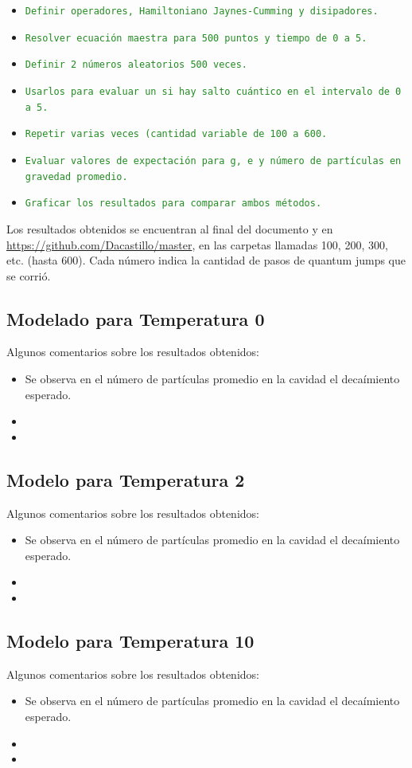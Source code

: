 \documentclass{book}
\begin{document}
\begin{itemize}
\item\textcolor{ForestGreen}{\texttt{Definir operadores, Hamiltoniano Jaynes-Cumming y disipadores.}}
\item\textcolor{ForestGreen}{\texttt{Resolver ecuación maestra para 500 puntos y tiempo de 0 a 5.}}
\item\textcolor{ForestGreen}{\texttt{Definir 2 números aleatorios 500 veces.}}
\item\textcolor{ForestGreen}{\texttt{Usarlos para evaluar un si hay salto cuántico en el intervalo de 0 a 5.}}
\item\textcolor{ForestGreen}{\texttt{Repetir varias veces (cantidad variable de 100 a 600.}}
\item\textcolor{ForestGreen}{\texttt{Evaluar valores de expectación para g, e y número de partículas en gravedad promedio.}}
\item\textcolor{ForestGreen}{\texttt{Graficar los resultados para comparar ambos métodos.}}
\end{itemize}
Los resultados obtenidos se encuentran al final del documento y en \textcolor{ForestGreen}{\url{https://github.com/Dacastillo/master}}, en las carpetas llamadas 100, 200, 300, etc. (hasta 600). Cada número indica la cantidad de pasos de quantum jumps que se corrió.
\subsection{{Modelado para Temperatura 0}}
Algunos comentarios sobre los resultados obtenidos:
\begin{itemize}
    \item  Se observa en el número de partículas promedio en la cavidad el decaímiento esperado.
    \item 
    \item 
\end{itemize}
\subsection{{Modelo para Temperatura 2}}
Algunos comentarios sobre los resultados obtenidos:
\begin{itemize}
    \item Se observa en el número de partículas promedio en la cavidad el decaímiento esperado.
    \item
    \item 
\end{itemize}
\subsection{{Modelo para Temperatura 10}}
Algunos comentarios sobre los resultados obtenidos:
\begin{itemize}
    \item  Se observa en el número de partículas promedio en la cavidad el decaímiento esperado.
    \item 
    \item 
\end{itemize}
\end{document}
